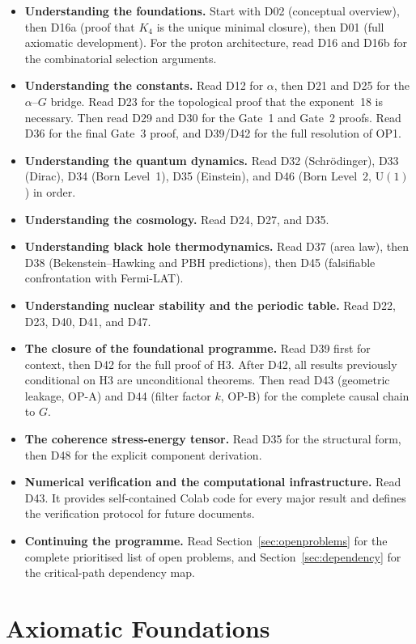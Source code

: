 \documentclass[11pt,a4paper]{article}
\theoremstyle{plain}
\theoremstyle{definition}
\theoremstyle{remark}
\begin{document}
\begin{itemize}
\item \textbf{Understanding the foundations.} Start with D02 (conceptual overview), then D16a (proof that $K_4$ is the unique minimal closure), then D01 (full axiomatic development). For the proton architecture, read D16 and D16b for the combinatorial selection arguments.
\item \textbf{Understanding the constants.} Read D12 for $\alpha$, then D21 and D25 for the $\alpha$--$G$ bridge. Read D23 for the topological proof that the exponent~18 is necessary. Then read D29 and D30 for the Gate~1 and Gate~2 proofs. Read D36 for the final Gate~3 proof, and D39/D42 for the full resolution of OP1.
\item \textbf{Understanding the quantum dynamics.} Read D32 (Schr\"odinger), D33 (Dirac), D34 (Born Level~1), D35 (Einstein), and D46 (Born Level~2, $\mathrm{U}(1)$) in order.
\item \textbf{Understanding the cosmology.} Read D24, D27, and D35.
\item \textbf{Understanding black hole thermodynamics.} Read D37 (area law), then D38 (Bekenstein--Hawking and PBH predictions), then D45 (falsifiable confrontation with Fermi-LAT).
\item \textbf{Understanding nuclear stability and the periodic table.} Read D22, D23, D40, D41, and D47.
\item \textbf{The closure of the foundational programme.} Read D39 first for context, then D42 for the full proof of H3. After D42, all results previously conditional on H3 are unconditional theorems. Then read D43 (geometric leakage, OP-A) and D44 (filter factor $k$, OP-B) for the complete causal chain to $G$.
\item \textbf{The coherence stress-energy tensor.} Read D35 for the structural form, then D48 for the explicit component derivation.
\item \textbf{Numerical verification and the computational infrastructure.} Read D43. It provides self-contained Colab code for every major result and defines the verification protocol for future documents.
\item \textbf{Continuing the programme.} Read Section~\ref{sec:openproblems} for the complete prioritised list of open problems, and Section~\ref{sec:dependency} for the critical-path dependency map.
\end{itemize}

\section{Axiomatic Foundations}
\label{sec:axioms}
\end{document}
